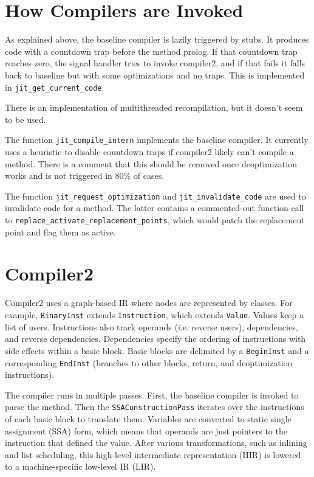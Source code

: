 \documentclass[draft,final]{vutinfth} %
\begin{document}
    \section{How Compilers are Invoked}

    As explained above, the baseline compiler is lazily triggered by stubs.
    It produces code with a countdown trap before the method prolog.
    If that countdown trap reaches zero, the signal handler
    tries to invoke compiler2, and if that fails it
    falls back to baseline but with some optimizations and no traps.
    This is implemented in \lstinline{jit_get_current_code}.

    There is an implementation of multithreaded recompilation,
    but it doesn't seem to be used.

    The function \lstinline{jit_compile_intern} implements the baseline compiler.
    It currently uses a heuristic to disable countdown traps if compiler2 likely can't compile a method.
    There is a comment that this should be removed once deoptimization works and is not triggered in 80\% of cases.

    The function \lstinline{jit_request_optimization} and \lstinline{jit_invalidate_code} are used to invalidate
    code for a method.
    The latter contains a commented-out function call to \linebreak \lstinline{replace_activate_replacement_points},
    which would patch the replacement point and flag them as active.


    \section{Compiler2}

    Compiler2 uses a graph-based IR
    where nodes are represented by classes.
    For example, \lstinline{BinaryInst} extends \lstinline{Instruction}, which extends \lstinline{Value}.
    Values keep a list of users.
    Instructions also track operands (i.e. reverse users), dependencies, and reverse dependencies.
    Dependencies specify the ordering of instructions with side effects within a basic block.
    Basic blocks are delimited by a \lstinline{BeginInst} and a corresponding \lstinline{EndInst} (branches to other blocks, return, and deoptimization instructions).

    The compiler runs in multiple passes.
    First, the baseline compiler is invoked to parse the method.
    Then the \lstinline{SSAConstructionPass} iterates over the instructions of each basic block to translate them.
    Variables are converted to static single assignment (SSA) form, which means that operands are just pointers to the
    instruction that defined the value.
    After various transformations, such as inlining and list scheduling, this high-level intermediate representation (HIR)
    is lowered to a machine-specific low-level IR (LIR).
\end{document}
